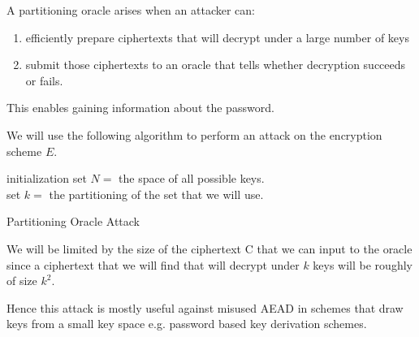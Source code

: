 \newpage

A partitioning oracle arises when an attacker can:
\begin{enumerate}
    \item efficiently prepare ciphertexts that will decrypt under a large number of keys
    \item submit those ciphertexts to an oracle that tells whether decryption succeeds or fails.
\end{enumerate}
This enables gaining information about the password.

We will use the following algorithm to perform an attack on the encryption scheme $E$.

\begin{algorithm}[H]

    initialization\;
    set $N =$ the space of all possible keys.\\
    set $k =$ the partitioning of the set that we will use.

    \caption{Partitioning Oracle Attack}\label{alg:algorithm}
\end{algorithm}


We will be limited by the size of the ciphertext C that we can input to the oracle since a ciphertext
that we will find that will decrypt under $k$ keys will be roughly of size $k^2$.

Hence this attack is mostly useful against misused AEAD in schemes that draw keys from a small key space e.g.
password based key derivation schemes.